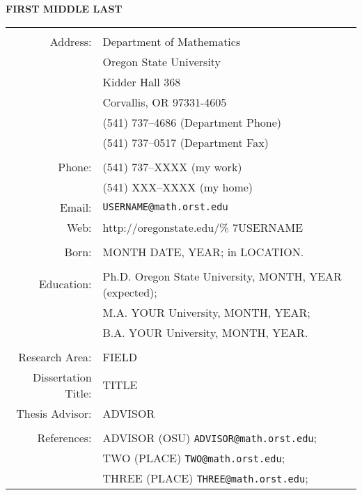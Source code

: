 \documentclass[11pt]{gthesis2}  %
\begin{document}
%
%
%
\begin{center}
\begin{Large}
{\bf FIRST MIDDLE LAST}\\ %
\end{Large}
\end{center}
%
\begin{tabular}{rl}
&\\
Address: &Department of Mathematics\\
         &Oregon State University\\
         &Kidder Hall 368\\
         &Corvallis, OR 97331-4605\\
         &(541) 737--4686 (Department Phone)\\
         &(541) 737--0517 (Department Fax)\\\\
Phone:      &(541) 737--XXXX (my work)\\
            &(541) XXX--XXXX (my home)\\
Email:      &\texttt{USERNAME@math.orst.edu}\\
Web:        &http://oregonstate.edu/\% 7USERNAME\\
&\\
Born:      &MONTH DATE, YEAR; in  LOCATION.\\
&\\
Education:  &Ph.D. Oregon State University, MONTH, YEAR (expected);\\
        &M.A.  YOUR University, MONTH, YEAR;\\
        &B.A.  YOUR University, MONTH, YEAR.\\
&\\
Research Area:      &FIELD\\
Dissertation Title: &TITLE\\
Thesis Advisor:     &ADVISOR\\
&\\
References: &ADVISOR (OSU) \texttt{ADVISOR@math.orst.edu};\\
            &TWO (PLACE) \texttt{TWO@math.orst.edu};\\
            &THREE (PLACE) \texttt{THREE@math.orst.edu};\\

\end{tabular}
\end{document}

